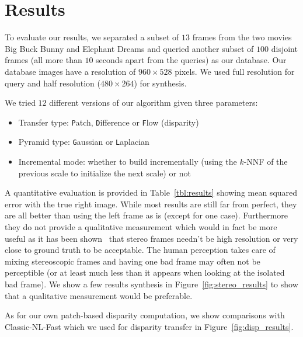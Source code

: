 

\section{Results}

To evaluate our results, we separated a subset of $13$ frames from the two movies Big Buck Bunny and Elephant Dreams and queried another subset of $100$ disjoint frames (all more than $10$ seconds apart from the queries) as our database.
Our database images have a resolution of $960\times 528$ pixels. We used full resolution for query and half resolution ($480\times 264$) for synthesis.

\newcommand{\SA}[3]{\texttt{#1}\texttt{#2}\texttt{#3}}

We tried $12$ different versions of our algorithm given three parameters:
\begin{itemize}
	\item Transfer type: \texttt{P}atch, \texttt{D}ifference or \texttt{F}low (disparity)
	\item Pyramid type: \texttt{G}aussian or \texttt{L}aplacian
	\item Incremental mode: whether to build incrementally (using the $k$-NNF of the previous scale to initialize the next scale) or not
\end{itemize}

A quantitative evaluation is provided in Table~\ref{tbl:results} showing mean squared error with the true right image.
While most results are still far from perfect, they are all better than using the left frame as is (except for one case).
Furthermore they do not provide a qualitative measurement which would in fact be more useful as it has been shown~\cite{Sawhney01, Stelmach00} that stereo frames needn't be high resolution or very close to ground truth to be acceptable.
The human perception takes care of mixing stereoscopic frames and having one bad frame may often not be perceptible (or at least much less than it appears when looking at the isolated bad frame).
We show a few results synthesis in Figure~\ref{fig:stereo_results} to show that a qualitative measurement would be preferable.

As for our own patch-based disparity computation, we show comparisons with Classic-NL-Fast which we used for disparity transfer in Figure~\ref{fig:disp_results}.
\newcommand{\best}[1]{\underline{#1}}
\newcommand{\good}{\color{goodcolor}}
\newcommand{\bad}{\color{red}}


